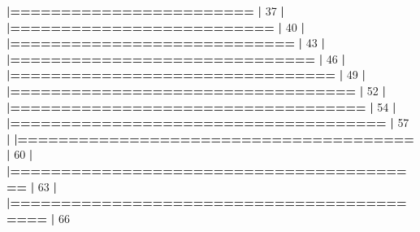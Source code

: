 \documentclass[]{book}
\newenvironment{Shaded}{\begin{snugshade}}{\end{snugshade}}
\newcommand{\DecValTok}[1]{\textcolor[rgb]{0.00,0.00,0.81}{#1}}
\newcommand{\ErrorTok}[1]{\textcolor[rgb]{0.64,0.00,0.00}{\textbf{#1}}}
\newcommand{\NormalTok}[1]{#1}
\newcommand{\OperatorTok}[1]{\textcolor[rgb]{0.81,0.36,0.00}{\textbf{#1}}}
\newcommand{\StringTok}[1]{\textcolor[rgb]{0.31,0.60,0.02}{#1}}
\begin{document}
\begin{Shaded}
\begin{Highlighting}[]
{{{{{{{{{{{{{{\StringTok{  }\ErrorTok{|========================}\StringTok{                                         }\ErrorTok{|}\StringTok{  }\DecValTok{37}\NormalTok{%}
  \OperatorTok{|}\StringTok{                                                                       }
\StringTok{  }\ErrorTok{|==========================}\StringTok{                                       }\ErrorTok{|}\StringTok{  }\DecValTok{40}\NormalTok{%}
  \OperatorTok{|}\StringTok{                                                                       }
\StringTok{  }\ErrorTok{|============================}\StringTok{                                     }\ErrorTok{|}\StringTok{  }\DecValTok{43}\NormalTok{%}
  \OperatorTok{|}\StringTok{                                                                       }
\StringTok{  }\ErrorTok{|==============================}\StringTok{                                   }\ErrorTok{|}\StringTok{  }\DecValTok{46}\NormalTok{%}
  \OperatorTok{|}\StringTok{                                                                       }
\StringTok{  }\ErrorTok{|================================}\StringTok{                                 }\ErrorTok{|}\StringTok{  }\DecValTok{49}\NormalTok{%}
  \OperatorTok{|}\StringTok{                                                                       }
\StringTok{  }\ErrorTok{|==================================}\StringTok{                               }\ErrorTok{|}\StringTok{  }\DecValTok{52}\NormalTok{%}
  \OperatorTok{|}\StringTok{                                                                       }
\StringTok{  }\ErrorTok{|===================================}\StringTok{                              }\ErrorTok{|}\StringTok{  }\DecValTok{54}\NormalTok{%}
  \OperatorTok{|}\StringTok{                                                                       }
\StringTok{  }\ErrorTok{|=====================================}\StringTok{                            }\ErrorTok{|}\StringTok{  }\DecValTok{57}\NormalTok{%}
  \OperatorTok{|}\StringTok{                                                                       }
\StringTok{  }\ErrorTok{|=======================================}\StringTok{                          }\ErrorTok{|}\StringTok{  }\DecValTok{60}\NormalTok{%}
  \OperatorTok{|}\StringTok{                                                                       }
\StringTok{  }\ErrorTok{|=========================================}\StringTok{                        }\ErrorTok{|}\StringTok{  }\DecValTok{63}\NormalTok{%}
  \OperatorTok{|}\StringTok{                                                                       }
\StringTok{  }\ErrorTok{|===========================================}\StringTok{                      }\ErrorTok{|}\StringTok{  }\DecValTok{66}\NormalTok{%}
}}}}}}}}}}}}}}}}}}}}}}}}}
\end{Highlighting}
\end{Shaded}
\end{document}
